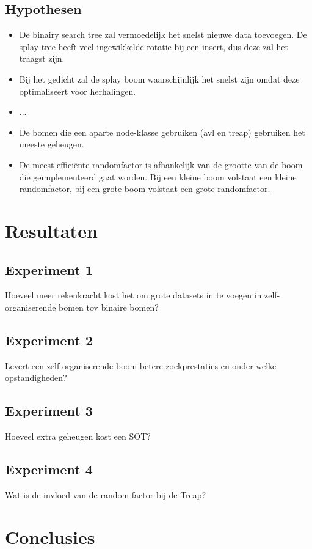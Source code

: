 \documentclass[a4paper,10pt]{article}
\begin{document}
\subsection{Hypothesen}

\begin{itemize}
\item De binairy search tree zal vermoedelijk het snelst nieuwe data toevoegen. De splay tree heeft veel ingewikkelde rotatie bij een insert, dus deze zal het traagst zijn.
\item Bij het gedicht zal de splay boom waarschijnlijk het snelst zijn omdat deze optimaliseert voor herhalingen.
\item ...
\item De bomen die een aparte node-klasse gebruiken (avl en treap) gebruiken het meeste geheugen.
\item De meest effici\"ente randomfactor is afhankelijk van de grootte van de boom die geïmplementeerd gaat worden. Bij een kleine boom volstaat een kleine randomfactor, bij een grote boom volstaat een grote randomfactor.
\end{itemize}

\section{Resultaten}

\subsection{Experiment 1}
Hoeveel meer rekenkracht kost het om grote datasets in te voegen in zelf-organiserende bomen tov binaire bomen?
\subsection{Experiment 2}
Levert een zelf-organiserende boom betere zoekprestaties en onder welke opstandigheden?
\subsection{Experiment 3}
Hoeveel extra geheugen kost een SOT?
\subsection{Experiment 4}
Wat is de invloed van de random-factor bij de Treap?
\section{Conclusies}
\end{document}

